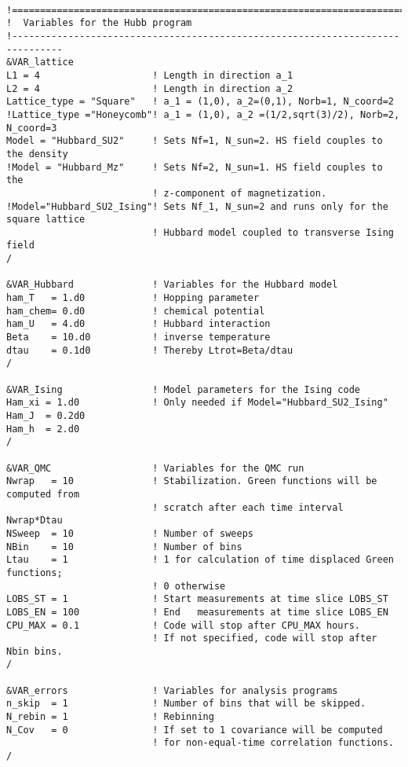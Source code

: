 \begin{lstlisting}[style=fortran]

!===============================================================================
!  Variables for the Hubb program
!-------------------------------------------------------------------------------
&VAR_lattice
L1 = 4                    ! Length in direction a_1
L2 = 4                    ! Length in direction a_2
Lattice_type = "Square"	  ! a_1 = (1,0), a_2=(0,1), Norb=1, N_coord=2
!Lattice_type ="Honeycomb"! a_1 = (1,0), a_2 =(1/2,sqrt(3)/2), Norb=2, N_coord=3
Model = "Hubbard_SU2"     ! Sets Nf=1, N_sun=2. HS field couples to the density
!Model = "Hubbard_Mz"     ! Sets Nf=2, N_sun=1. HS field couples to the 
                          ! z-component of magnetization.  
!Model="Hubbard_SU2_Ising"! Sets Nf_1, N_sun=2 and runs only for the square lattice
                          ! Hubbard model coupled to transverse Ising field
/

&VAR_Hubbard              ! Variables for the Hubbard model
ham_T   = 1.d0            ! Hopping parameter
ham_chem= 0.d0            ! chemical potential
ham_U   = 4.d0            ! Hubbard interaction
Beta    = 10.d0           ! inverse temperature
dtau    = 0.1d0           ! Thereby Ltrot=Beta/dtau
/

&VAR_Ising                ! Model parameters for the Ising code
Ham_xi = 1.d0             ! Only needed if Model="Hubbard_SU2_Ising"
Ham_J  = 0.2d0
Ham_h  = 2.d0
/

&VAR_QMC                  ! Variables for the QMC run
Nwrap   = 10              ! Stabilization. Green functions will be computed from 
                          ! scratch after each time interval Nwrap*Dtau
NSweep  = 10              ! Number of sweeps
NBin    = 10              ! Number of bins
Ltau    = 1               ! 1 for calculation of time displaced Green functions;
                          ! 0 otherwise
LOBS_ST = 1               ! Start measurements at time slice LOBS_ST
LOBS_EN = 100             ! End   measurements at time slice LOBS_EN
CPU_MAX = 0.1             ! Code will stop after CPU_MAX hours. 
                          ! If not specified, code will stop after Nbin bins.
/

&VAR_errors               ! Variables for analysis programs
n_skip  = 1               ! Number of bins that will be skipped. 
N_rebin = 1               ! Rebinning  
N_Cov   = 0               ! If set to 1 covariance will be computed
                          ! for non-equal-time correlation functions.                   
/            
\end{lstlisting}
%

